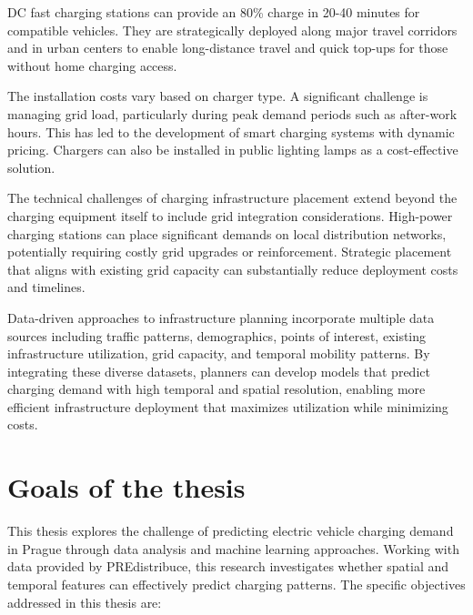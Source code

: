 DC fast charging stations can provide an 80\% charge in 20-40 minutes for compatible vehicles. They are strategically deployed along major travel corridors and in urban centers to enable long-distance travel and quick top-ups for those without home charging access.

The installation costs vary based on charger type. A significant challenge is managing grid load, particularly during peak demand periods such as after-work hours. This has led to the development of smart charging systems with dynamic pricing. Chargers can also be installed in public lighting lamps as a cost-effective solution.

The technical challenges of charging infrastructure placement extend beyond the charging equipment itself to include grid integration considerations. High-power charging stations can place significant demands on local distribution networks, potentially requiring costly grid upgrades or reinforcement. Strategic placement that aligns with existing grid capacity can substantially reduce deployment costs and timelines.

Data-driven approaches to infrastructure planning incorporate multiple data sources including traffic patterns, demographics, points of interest, existing infrastructure utilization, grid capacity, and temporal mobility patterns. By integrating these diverse datasets, planners can develop models that predict charging demand with high temporal and spatial resolution, enabling more efficient infrastructure deployment that maximizes utilization while minimizing costs.

\section{Goals of the thesis}

This thesis explores the challenge of predicting electric vehicle charging demand in Prague through data analysis and machine learning approaches. Working with data provided by PREdistribuce, this research investigates whether spatial and temporal features can effectively predict charging patterns. The specific objectives addressed in this thesis are:

